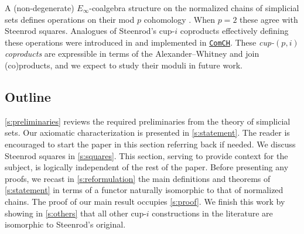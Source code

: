 A (non-degenerate) $E_\infty$-coalgebra structure on the normalized chains of simplicial sets defines operations on their mod $p$ cohomology \cite{steenrod1953cyclic, may1970general}.
When $p = 2$ these agree with Steenrod squares.
Analogues of Steenrod's \mbox{cup-$i$} coproducts effectively defining these operations were introduced in \cite{medina2021may_st} and implemented in \href{https://github.com/ammedmar/comch}{\texttt{ComCH}}.
These \textit{cup-$(p,i)$ coproducts} are expressible in terms of the Alexander--Whitney and join (co)products, and we expect to study their moduli in future work.

\subsection*{Outline}

\cref{s:preliminaries} reviews the required preliminaries from the theory of simplicial sets.
Our axiomatic characterization is presented in \cref{s:statement}.
The reader is encouraged to start the paper in this section referring back if needed.
We discuss Steenrod squares in \cref{s:squares}.
This section, serving to provide context for the subject, is logically independent of the rest of the paper.
Before presenting any proofs, we recast in \cref{s:reformulation} the main definitions and theorems of \cref{s:statement} in terms of a functor naturally isomorphic to that of normalized chains.
The proof of our main result occupies \cref{s:proof}.
We finish this work by showing in \cref{s:others} that all other \mbox{cup-$i$} constructions in the literature are isomorphic to Steenrod's original.


